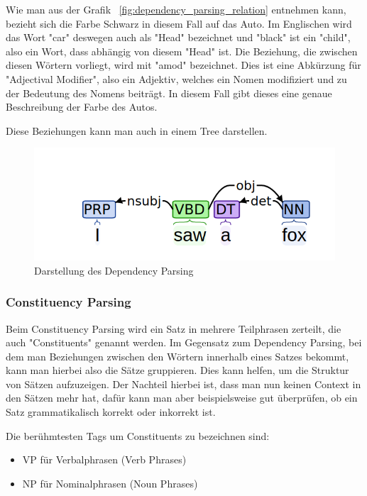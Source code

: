 Wie man aus der Grafik ~\ref{fig:dependency_parsing_relation} entnehmen kann, bezieht sich die Farbe Schwarz in diesem Fall auf das Auto.
Im Englischen wird das Wort "car" deswegen auch als "Head" bezeichnet und "black" ist ein "child", also ein Wort, dass abhängig von diesem "Head" ist.
Die Beziehung, die zwischen diesen Wörtern vorliegt, wird mit "amod" bezeichnet.
Dies ist eine Abkürzung für "Adjectival Modifier", also ein Adjektiv, welches ein Nomen modifiziert und zu der Bedeutung des Nomens beiträgt.
In diesem Fall gibt dieses eine genaue Beschreibung der Farbe des Autos.\cite{dependencyParsing}

Diese Beziehungen kann man auch in einem Tree darstellen.

\begin{figure}[hbt!]
    \centering
    \includegraphics[scale=0.5]{pics/dependency_parse_tree}
    \caption{Darstellung des Dependency Parsing~\cite{dependencyVsConstituencyParsing}}
    \label{fig:dependency_parsing_tree}
\end{figure}

\subsubsection{Constituency Parsing}

Beim Constituency Parsing wird ein Satz in mehrere Teilphrasen zerteilt, die auch "Constituents" genannt werden.
Im Gegensatz zum Dependency Parsing, bei dem man Beziehungen zwischen den Wörtern innerhalb eines Satzes bekommt, kann man hierbei also die Sätze gruppieren.
Dies kann helfen, um die Struktur von Sätzen aufzuzeigen.
Der Nachteil hierbei ist, dass man nun keinen Context in den Sätzen mehr hat, dafür kann man aber beispielsweise gut überprüfen, ob ein Satz grammatikalisch korrekt oder inkorrekt ist.\cite{machineLearningTextAnalysis}

Die berühmtesten Tags um Constituents zu bezeichnen sind:

\begin{itemize}
    \item VP für Verbalphrasen (Verb Phrases)
    \item NP für Nominalphrasen (Noun Phrases)
\end{itemize}

